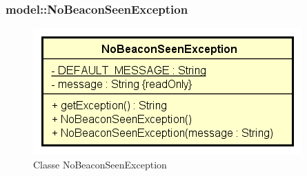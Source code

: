 \documentclass[../DefinizioneDiProdotto.tex]{subfiles}
\begin{document}
\subsubsection{model::NoBeaconSeenException}

    \begin{figure}[H]
        \centering
        \includegraphics{img/NoBeaconSeenException.png}
        \caption{Classe NoBeaconSeenException}\label{fig:model::NoBeaconSeenException} 
    \end{figure}
\end{document}
